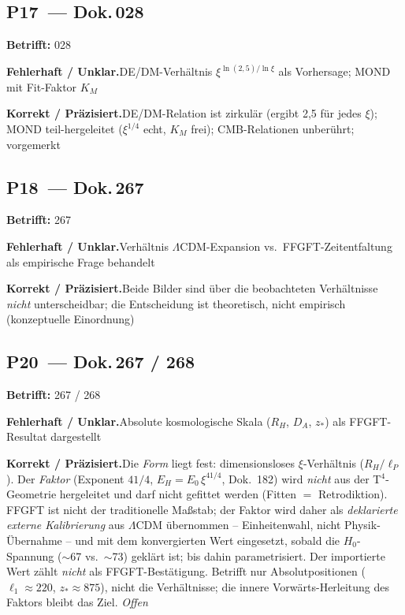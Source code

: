 \medskip


\subsection*{P17~--- Dok.\,028}

\noindent\textbf{Betrifft:} 028


\smallskip\noindent\textbf{Fehlerhaft / Unklar.}\quad DE/DM-Verhältnis $\xi^{\ln(2{,}5)/\ln\xi}$ als Vorhersage; MOND mit Fit-Faktor $K_M$


\smallskip\noindent\textbf{Korrekt / Präzisiert.}\quad DE/DM-Relation ist zirkulär (ergibt 2,5 für jedes $\xi$); MOND teil-hergeleitet ($\xi^{1/4}$ echt, $K_M$ frei); CMB-Relationen unberührt; vorgemerkt


\medskip


\subsection*{P18~--- Dok.\,267}

\noindent\textbf{Betrifft:} 267


\smallskip\noindent\textbf{Fehlerhaft / Unklar.}\quad Verhältnis $\Lambda$CDM-Expansion vs.\ FFGFT-Zeitentfaltung als empirische Frage behandelt


\smallskip\noindent\textbf{Korrekt / Präzisiert.}\quad Beide Bilder sind über die beobachteten Verhältnisse \emph{nicht} unterscheidbar; die Entscheidung ist theoretisch, nicht empirisch (konzeptuelle Einordnung)


\medskip


\subsection*{P20~--- Dok.\,267 / 268}

\noindent\textbf{Betrifft:} 267 / 268


\smallskip\noindent\textbf{Fehlerhaft / Unklar.}\quad Absolute kosmologische Skala ($R_H$, $D_A$, $z_*$) als FFGFT-Resultat dargestellt


\smallskip\noindent\textbf{Korrekt / Präzisiert.}\quad Die \emph{Form} liegt fest: dimensionsloses $\xi$-Verhältnis ($R_H/\ell_P$). Der \emph{Faktor} (Exponent $41/4$, $E_H = E_0\,\xi^{41/4}$, Dok.~182) wird \emph{nicht} aus der T$^4$-Geometrie hergeleitet und darf nicht gefittet werden (Fitten $=$ Retrodiktion). FFGFT ist nicht der traditionelle Maßstab; der Faktor wird daher als \emph{deklarierte externe Kalibrierung} aus $\Lambda$CDM übernommen -- Einheitenwahl, nicht Physik-Übernahme -- und mit dem konvergierten Wert eingesetzt, sobald die $H_0$-Spannung ($\sim$67 vs.\ $\sim$73) geklärt ist; bis dahin parametrisiert. Der importierte Wert zählt \emph{nicht} als FFGFT-Bestätigung. Betrifft nur Absolutpositionen ($\ell_1\approx220$, $z_*\approx875$), nicht die Verhältnisse; die innere Vorwärts-Herleitung des Faktors bleibt das Ziel. \emph{Offen}


